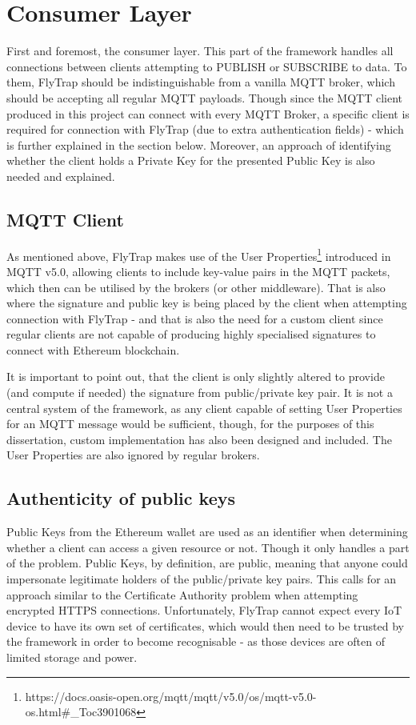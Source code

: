 \section{Consumer Layer}
First and foremost, the consumer layer. This part of the framework handles all connections between clients attempting to PUBLISH or SUBSCRIBE to data. To them, FlyTrap should be indistinguishable from a vanilla MQTT broker, which should be accepting all regular MQTT payloads. Though since the MQTT client produced in this project can connect with every MQTT Broker, a specific client is required for connection with FlyTrap (due to extra authentication fields) - which is further explained in the section below. Moreover, an approach of identifying whether the client holds a Private Key for the presented Public Key is also needed and explained. 
\subsection{MQTT Client}
As mentioned above, FlyTrap makes use of the User Properties\footnote{https://docs.oasis-open.org/mqtt/mqtt/v5.0/os/mqtt-v5.0-os.html\#\_Toc3901068} introduced in MQTT v5.0, allowing clients to include key-value pairs in the MQTT packets, which then can be utilised by the brokers (or other middleware). That is also where the signature and public key is being placed by the client when attempting connection with FlyTrap - and that is also the need for a custom client since regular clients are not capable of producing highly specialised signatures to connect with Ethereum blockchain.

It is important to point out, that the client is only slightly altered to provide (and compute if needed) the signature from public/private key pair. It is not a central system of the framework, as any client capable of setting User Properties for an MQTT message would be sufficient, though, for the purposes of this dissertation, custom implementation has also been designed and included. The User Properties are also ignored by regular brokers.

\subsection{Authenticity of public keys}
Public Keys from the Ethereum wallet are used as an identifier when determining whether a client can access a given resource or not. Though it only handles a part of the problem. Public Keys, by definition, are public, meaning that anyone could impersonate legitimate holders of the public/private key pairs. This calls for an approach similar to the Certificate Authority problem when attempting encrypted HTTPS connections. Unfortunately, FlyTrap cannot expect every IoT device to have its own set of certificates, which would then need to be trusted by the framework in order to become recognisable - as those devices are often of limited storage and power.

